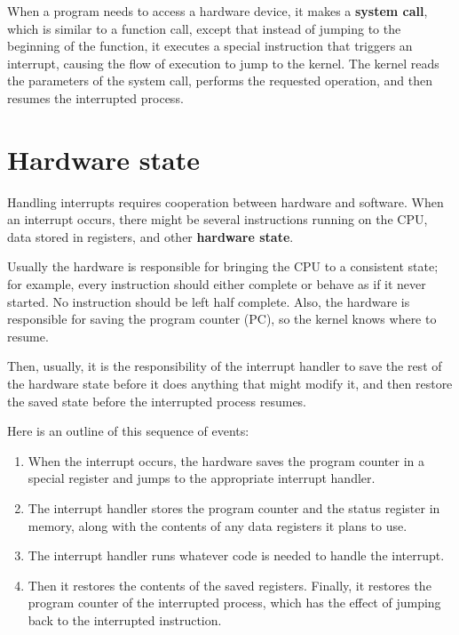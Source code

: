 \documentclass[12pt]{book}
\begin{document}
{When a program needs to access a hardware device,
it makes a {\bf system call}, which is similar to a function call,
except that instead of jumping to the beginning of the function,
it executes a special instruction that triggers an interrupt, causing
the flow of execution to jump to the kernel.  The kernel reads the
parameters of the system call, performs the requested operation,
and then resumes the interrupted process.


\section{Hardware state}

Handling interrupts requires cooperation between hardware and
software.  When an interrupt occurs, there might be several
instructions running on the CPU, data stored in registers, and
other {\bf hardware state}.

Usually the hardware is responsible for bringing the CPU
to a consistent state; for example, every instruction should either
complete or behave as if it never started.  No instruction should
be left half complete.  Also, the hardware is responsible for
saving the program counter (PC), so the kernel knows where to
resume.

Then, usually, it is the responsibility of the interrupt handler
to save the rest of the hardware state before it does anything that
might modify it, and then restore the saved state before the interrupted
process resumes.

Here is an outline of this sequence of events:

\begin{enumerate}

\item When the interrupt occurs, the hardware saves the program
counter in a special register and jumps to the appropriate interrupt
handler.

\item The interrupt handler stores the program counter and the
status register in memory, along with the contents of any data
registers it plans to use.

\item The interrupt handler runs whatever code is needed to handle
the interrupt.

\item Then it restores the contents of the saved registers.  Finally,
it restores the program counter of the interrupted process, which
has the effect of jumping back to the interrupted instruction.


\end{enumerate}}
\end{document}
